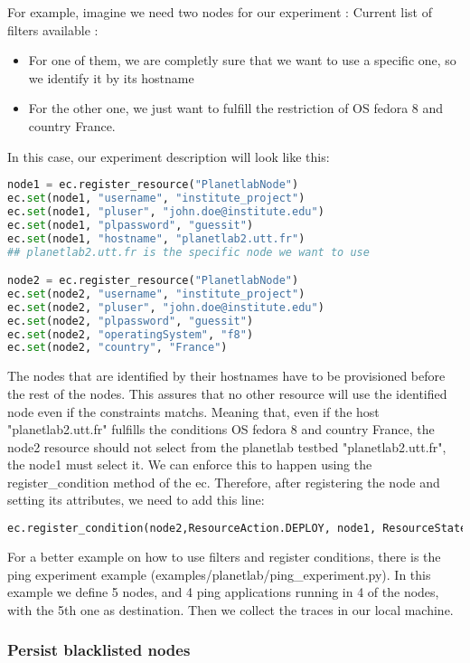 For example, imagine we need two nodes for our experiment :
Current list of filters available :
\begin{itemize}
  \item For one of them, we are completly sure that we want to use a specific one, so we identify it by its hostname
  \item For the other one, we just want to fulfill the restriction of OS fedora 8 and country France.
\end{itemize}

In this case, our experiment description will look like this:
\begin{lstlisting}[language=Python]
node1 = ec.register_resource("PlanetlabNode")
ec.set(node1, "username", "institute_project")
ec.set(node1, "pluser", "​​john.doe@institute.edu")
ec.set(node1, "plpassword", "guessit")
ec.set(node1, "hostname", "planetlab2.utt.fr") 
## planetlab2.utt.fr is the specific node we want to use

node2 = ec.register_resource("PlanetlabNode")
ec.set(node2, "username", "institute_project")
ec.set(node2, "pluser", "​​john.doe@institute.edu")
ec.set(node2, "plpassword", "guessit")
ec.set(node2, "operatingSystem", "f8")
ec.set(node2, "country", "France")
\end{lstlisting}
The nodes that are identified by their hostnames have to be provisioned before the rest of the nodes. This assures that no other resource will use the identified node even if the constraints matchs. Meaning that, even if the host "planetlab2.utt.fr" fulfills the conditions OS fedora 8 and country France, the node2 resource should not select from the planetlab testbed "planetlab2.utt.fr", the node1 must select it. We can enforce this to happen using the register\_condition method of the ec. Therefore, after registering the node and setting its attributes, we need to add this line:
\begin{lstlisting}[language=Python]
ec.register_condition(node2,ResourceAction.DEPLOY, node1, ResourceState.PROVISIONED)
\end{lstlisting}
For a better example on how to use filters and register conditions, there is the ping experiment example (examples/planetlab/ping\_experiment.py). In this example we define 5 nodes, and 4 ping applications running in 4 of the nodes, with the 5th one as destination. Then we collect the traces in our local machine.


\subsubsection{Persist blacklisted nodes}

